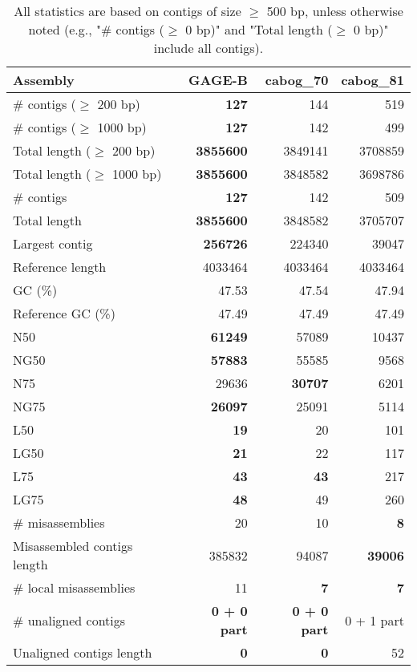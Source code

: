 \documentclass[12pt,a4paper]{article}
\begin{document}
\begin{table}[ht]
\begin{center}
\caption{All statistics are based on contigs of size $\geq$ 500 bp, unless otherwise noted (e.g., "\# contigs ($\geq$ 0 bp)" and "Total length ($\geq$ 0 bp)" include all contigs).}
\begin{tabular}{|l*{3}{|r}|}
\hline
Assembly & GAGE-B & cabog\_70 & cabog\_81 \\ \hline
\# contigs ($\geq$ 200 bp) & {\bf 127} & 144 & 519 \\ \hline
\# contigs ($\geq$ 1000 bp) & {\bf 127} & 142 & 499 \\ \hline
Total length ($\geq$ 200 bp) & {\bf 3855600} & 3849141 & 3708859 \\ \hline
Total length ($\geq$ 1000 bp) & {\bf 3855600} & 3848582 & 3698786 \\ \hline
\# contigs & {\bf 127} & 142 & 509 \\ \hline
Total length & {\bf 3855600} & 3848582 & 3705707 \\ \hline
Largest contig & {\bf 256726} & 224340 & 39047 \\ \hline
Reference length & 4033464 & 4033464 & 4033464 \\ \hline
GC (\%) & 47.53 & 47.54 & 47.94 \\ \hline
Reference GC (\%) & 47.49 & 47.49 & 47.49 \\ \hline
N50 & {\bf 61249} & 57089 & 10437 \\ \hline
NG50 & {\bf 57883} & 55585 & 9568 \\ \hline
N75 & 29636 & {\bf 30707} & 6201 \\ \hline
NG75 & {\bf 26097} & 25091 & 5114 \\ \hline
L50 & {\bf 19} & 20 & 101 \\ \hline
LG50 & {\bf 21} & 22 & 117 \\ \hline
L75 & {\bf 43} & {\bf 43} & 217 \\ \hline
LG75 & {\bf 48} & 49 & 260 \\ \hline
\# misassemblies & 20 & 10 & {\bf 8} \\ \hline
Misassembled contigs length & 385832 & 94087 & {\bf 39006} \\ \hline
\# local misassemblies & 11 & {\bf 7} & {\bf 7} \\ \hline
\# unaligned contigs & {\bf 0 + 0 part} & {\bf 0 + 0 part} & 0 + 1 part \\ \hline
Unaligned contigs length & {\bf 0} & {\bf 0} & 52 \\ \hline

\end{tabular}
\end{center}
\end{table}
\end{document}
